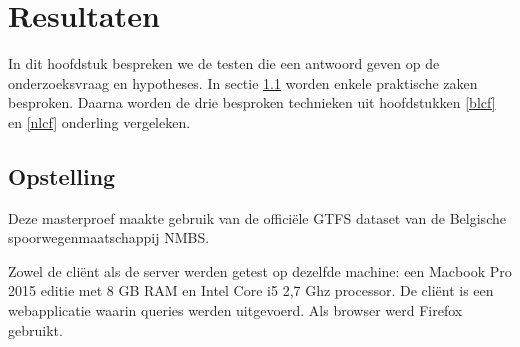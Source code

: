 \chapter{Resultaten}

In dit hoofdstuk bespreken we de testen die een antwoord geven op de onderzoeksvraag en hypotheses. In sectie \ref{opstelling} worden enkele praktische zaken besproken. Daarna worden de drie besproken technieken uit hoofdstukken \ref{blcf} en \ref{nlcf} onderling vergeleken.

\section{Opstelling}
\label{opstelling}
Deze masterproef maakte gebruik van de offici\"ele GTFS dataset van de Belgische spoorwegenmaatschappij NMBS. 

Zowel de cli\"ent als de server werden getest op dezelfde machine: een Macbook Pro 2015 editie met 8 GB RAM en Intel Core i5 2,7 Ghz processor. De cli\"ent is een webapplicatie waarin queries werden uitgevoerd. Als browser werd Firefox gebruikt.



%

